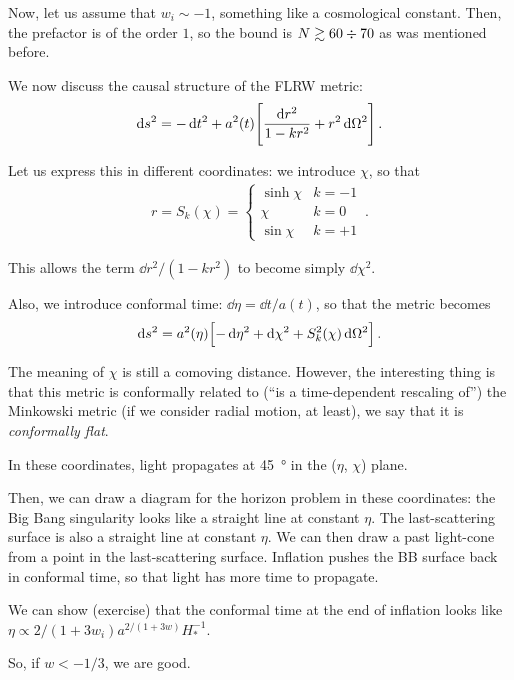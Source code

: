 \documentclass[main.tex]{subfiles}
\begin{document}
Now, let us assume that \(w_i \sim -1\), something like a cosmological constant. Then, the prefactor is of the order \(1\), so the bound is \(N \gtrsim 60 \divisionsymbol 70\) as was mentioned before. 

We now discuss the causal structure of the FLRW metric: 
%
\begin{align}
\dd{s^2} = - \dd{t^2} + a^2(t) \qty[ \frac{ \dd{r^2}}{1 - kr^2} + r^2 \dd{\Omega^2}]
\,.
\end{align}

Let us express this in different coordinates: we introduce \(\chi \), so that 
%
\begin{align}
r = S_k (\chi ) = \begin{cases}
    \sinh \chi & k = -1  \\
    \chi & k = 0 \\
    \sin \chi & k = +1
\end{cases}
\,.
\end{align}

This allows the term \(\dd{r^2} / (1 - kr^2)\) to become simply \(\dd{\chi^2}\). 

Also, we introduce conformal time: \(\dd{\eta } = \dd{t} / a(t)\), so that the metric becomes 
%
\begin{align}
\dd{s^2} = a^2(\eta ) \qty[- \dd{ \eta^2} + \dd{\chi^2} + S_k^2 (\chi ) \dd{\Omega^2}]
\,.
\end{align}

The meaning of \(\chi \) is still a comoving distance. 
However, the interesting thing is that this metric is conformally related to (``is a time-dependent rescaling of'') the Minkowski metric (if we consider radial motion, at least), we say that it is \emph{conformally flat}.

In these coordinates, light propagates at \SI{45}{\degree} in the (\(\eta \), \(\chi \)) plane. 

Then, we can draw a diagram for the horizon problem in these coordinates: the Big Bang singularity looks like a straight line at constant \(\eta \). 
The last-scattering surface is also a straight line at constant \(\eta \).
We can then draw a past light-cone from a point in the last-scattering surface. Inflation pushes the BB surface back in conformal time, so that light has more time to propagate. 

We can show (exercise) that the conformal time at the end of inflation looks like \(\eta \propto 2 / (1 + 3 w_i) a^{2 / (1 + 3w)} H_*^{-1}\). 

So, if \(w < - 1/3\), we are good. 
\end{document}
